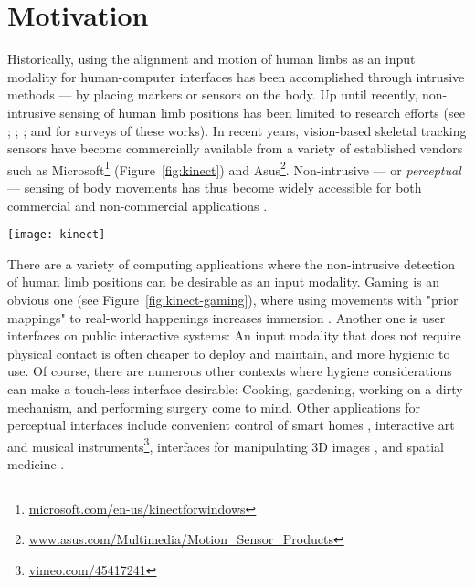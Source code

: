 \section{Motivation}
\label{sec:motivation}

Historically, using the alignment and motion of human limbs as an input modality for human-computer interfaces has been accomplished through intrusive methods --- by placing markers or sensors on the body. Up until recently, non-intrusive sensing of human limb positions has been limited to research efforts (see \textcite{Moeslund:2006}; \textcite{Porta:2002}; \textcite{Moeslund:2001}; and \textcite{Gavrila:1999} for surveys of these works). In recent years, vision-based skeletal tracking sensors have become commercially available from a variety of established vendors such as Microsoft\footnote{\href{http://www.microsoft.com/en-us/kinectforwindows/}{microsoft.com/en-us/kinectforwindows}} (Figure~\ref{fig:kinect}) and Asus\footnote{\href{http://www.asus.com/Multimedia/Motion_Sensor_Products/}{www.asus.com/Multimedia/Motion\_Sensor\_Products}}. Non-intrusive --- or \emph{perceptual} \parencite{Turk:2000, Crowley:2000} --- sensing of body movements has thus become widely accessible for both commercial and non-commercial applications \parencite{Francese:2012}.

\begin{SCfigure}[3][ht]
\centering
\texttt{[image: kinect]}
\caption{The Microsoft Kinect sensor is equipped with a depth camera that can "see" the positions and motion of human limbs.}
\label{fig:kinect}
\end{SCfigure}

There are a variety of computing applications where the non-intrusive detection of human limb positions can be desirable as an input modality. Gaming is an obvious one (see Figure~\ref{fig:kinect-gaming}), where using movements with "prior mappings" to real-world happenings increases immersion \parencite{Cairns:2014}. Another one is user interfaces on public interactive systems: An input modality that does not require physical contact is often cheaper to deploy and maintain, and more hygienic to use. Of course, there are numerous other contexts where hygiene considerations can make a touch-less interface desirable: Cooking, gardening, working on a dirty mechanism, and performing surgery \parencite{Wen:2013} come to mind. Other applications for perceptual interfaces include convenient control of smart homes \parencite{Tang:2013}, interactive art and musical instruments\footnote{\href{http://vimeo.com/45417241}{vimeo.com/45417241}}, interfaces for manipulating 3D images \parencite{Gallo:2013}, and spatial medicine \parencite{Lozano-Quilis:2013, Huang:2011, Simmons:2013}.


